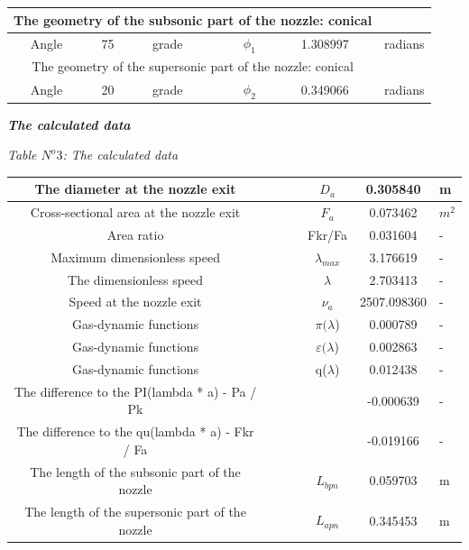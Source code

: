 \begin{center}
\begin{tabular}{  | c | c | c | c | c | c | c | }
\hline
\multicolumn{6}{|c}{ The geometry of the subsonic part of the nozzle: conical }&  \\
\hline
Angle & 75 & grade &  & $\phi_1$ & 1.308997 & radians \\
\hline
\multicolumn{6}{|c}{ The geometry of the supersonic part of the nozzle: conical }&  \\
\hline
Angle & 20 & grade &  & $\phi_2$ & 0.349066 & radians \\
\hline
\end{tabular}

\begin{center}
\textbf{\textit{The calculated data}}\\
\end{center}
\begin{flushright}
\textit{Table $N^o 3$: The calculated data}\\
\end{flushright}
\begin{tabular}{  | c | p{1.5cm} | p{1.5cm} | p{1.5cm} | c | c | p{1.5cm} | }
\hline
The diameter at the nozzle exit &  &  &  & $D_a$ & 0.305840 & m \\
\hline
Cross-sectional area at the nozzle exit &  &  &  & $F_a$ & 0.073462 & $m^2$ \\
\hline
Area ratio &  &  &  & Fkr/Fa & 0.031604 & - \\
\hline
Maximum dimensionless speed &  &  &  & $\lambda_{max}$ & 3.176619 & - \\
\hline
The dimensionless speed &  &  &  & $\lambda$ & 2.703413 & - \\
\hline
Speed at the nozzle exit &  &  &  & $\nu_a$ & 2507.098360 & - \\
\hline
Gas-dynamic functions &  &  &  & $\pi(\lambda$) & 0.000789 & - \\
\hline
Gas-dynamic functions &  &  &  & $\varepsilon(\lambda$) & 0.002863 & - \\
\hline
Gas-dynamic functions &  &  &  & q($\lambda$) & 0.012438 & - \\
\hline
The difference to the PI(lambda * a) - Pa / Pk &  &  &  &  & -0.000639 & - \\
\hline
The difference to the qu(lambda * a) - Fkr / Fa &  &  &  &  & -0.019166 & - \\
\hline
The length of the subsonic part of the nozzle &  &  &  & $L_{bpn}$ & 0.059703 & m \\
\hline
The length of the supersonic part of the nozzle &  &  &  & $L_{apn}$ & 0.345453 & m \\
\hline
\end{tabular}
\end{center}
